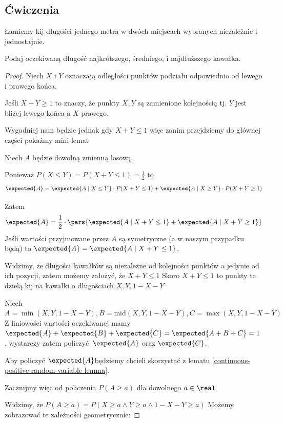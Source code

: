 \newpage
\subsection{Ćwiczenia}
\begin{exercise}
	\label{breaking-sticks-in-three-parts}
	Łamiemy kij długości jednego metra w dwóch miejscach wybranych niezależnie i jednostajnie.

	Podaj oczekiwaną długość najkrótszego, średniego, i najdłuższego kawałka.
\end{exercise}

\begin{proof}
	Niech \(X\) i \(Y\) oznaczają odległości punktów podziału odpowiednio od lewego i prawego końca.

	Jeśli \(X + Y \geq 1\) to znaczy, że punkty \(X, Y\) są zamienione kolejnością tj. \(Y\) jest bliżej lewego końca a \(X\) prawego.

	Wygodniej nam będzie jednak gdy \(X + Y \leq 1\) więc zanim przejdziemy do głównej części pokażmy mini-lemat

	Niech \(A\) będzie dowolną zmienną losową.

	Ponieważ \(P(X \leq Y) = P(X + Y \leq 1) = \frac{1}{2} \) to
	\[
		\expected{A} =
		\expected{A \mid X \leq Y} \cdot P(X + Y \leq 1) +
		\expected{A \mid X \geq Y} \cdot P(X + Y \geq 1)
	\]

	Zatem
	\[
		\expected{A} = \frac{1}{2} \cdot \pars{\expected{A \mid X + Y \leq 1} + \expected{A \mid X + Y \geq 1}}
	\]
	Jeśli wartości przyjmowane przez \(A\) są symetryczne (a w naszym przypadku będą)
	to \( \expected{A} = \expected{A \mid X + Y \leq 1} \).


	Widzimy, że długości kawałków są niezależne od kolejności punktów a jedynie od ich pozycji,
	zatem możemy założyć, że \(X + Y \leq 1\)
	Skoro \(X + Y \leq 1\) to punkty te dzielą kij na kawałki o długościach \(X, Y, 1 - X - Y\)


	Niech \(A = \min(X, Y, 1 - X - Y), B = \text{mid}(X, Y, 1 - X - Y), C = \max(X, Y, 1 - X - Y)\)
	Z liniowości wartości oczekiwanej mamy \(\expected{A} + \expected{B} + \expected{C} = \expected{A + B + C} = 1\),
	wystarczy zatem policzyć \(\expected{A}\) oraz \(\expected{C}\).

	Aby policzyć \(\expected{A}\)będziemy chcieli skorzystać z lematu \ref{continuous-positive-random-variable-lemma}.

	Zacznijmy więc od policzenia \( P(A \geq a) \) dla dowolnego \(a \in \real\)

	Widzimy, że \( P(A \geq a) = P(X \geq a \land Y \geq a \land 1 - X - Y \geq a) \)
	Możemy zobrazować te zależności geometrycznie:


\end{proof}

